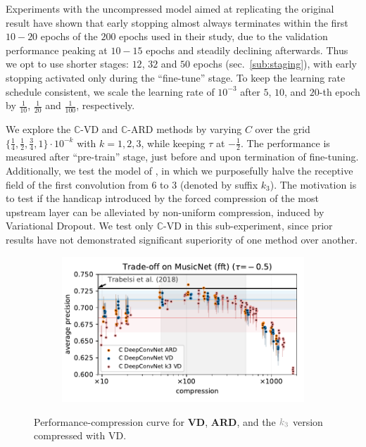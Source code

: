 \documentclass[a4paper,10pt,twocolumn]{article}
\newcommand{\cplx}{\mathbb{C}}
\begin{document}
Experiments with the uncompressed model aimed at replicating the original result have
shown that early stopping almost always terminates within the first $10-20$ epochs of
the $200$ epochs used in their study, due to the validation performance peaking at
$10-15$ epochs and steadily declining afterwards.
%
Thus we opt to use shorter stages: $12$, $32$ and $50$ epochs (sec.~\ref{sub:staging}),
with early stopping activated only during the ``fine-tune'' stage. To keep the learning
rate schedule consistent, we scale the learning rate of $10^{-3}$ after $5$, $10$, and
$20$-th epoch by $\tfrac1{10}$, $\tfrac1{20}$ and $\tfrac1{100}$, respectively.

We explore the $\cplx$-VD and $\cplx$-ARD methods by varying $C$ over the grid $
  \{\tfrac14, \tfrac12, \tfrac34, 1\} \cdot 10^{-k}
$ with $k=1, 2, 3$, while keeping $\tau$ at $-\tfrac12$. The performance is measured after
``pre-train'' stage, just before and upon termination of fine-tuning.
%
Additionally, we test the model of \citet{trabelsi_deep_2018}, in which we purposefully
halve the receptive field of the first convolution from $6$ to $3$ (denoted by suffix $k_3$).
The motivation is to test if the handicap introduced by the forced compression of the most
upstream layer can be alleviated by non-uniform compression, induced by Variational Dropout.
We test only $\cplx$-VD in this sub-experiment, since prior results have not demonstrated
significant superiority of one method over another.  %

\begin{figure}[!t]
  \centering
  \begin{subfigure}[b]{1.\columnwidth}  %
    \centering
    \includegraphics[width=\columnwidth]{figure__musicnet__trade-off/paper__musicnetram__fft__-0.5.pdf}
  \end{subfigure}
  \caption{%
    Performance-compression curve for \textbf{\color{blue} VD}, \textbf{\color{orange} ARD},
    and the ${\color{gray} k_3}$ version compressed with VD.
  }
  \label{fig:musicnet__trade-off}
\end{figure}
\end{document}
